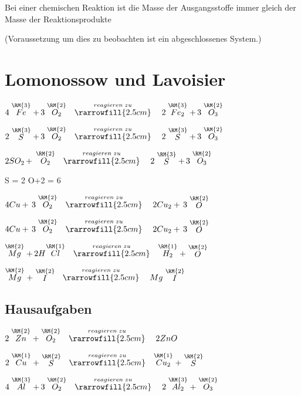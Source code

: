 Bei einer chemischen Reaktion ist die Masse der Ausgangsstoffe immer gleich der Masse der Reaktionsprodukte

(Voraussetzung um dies zu beobachten ist ein abgeschlossenes System.)

\section{Lomonossow und Lavoisier}
$4\stackrel{\RM{3}}{Fe} +\, 3\stackrel{\RM{2}}{O_2} \quad\stackrel{reagieren\;zu}{\rarrowfill{2.5cm}}\quad
2\stackrel{\RM{3}}{Fe_2} +\, 3\stackrel{\RM{2}}{O_3}$

$2\stackrel{\RM{3}}{S} +\, 3\stackrel{\RM{2}}{O_2} \quad\stackrel{reagieren\;zu}{\rarrowfill{2.5cm}}\quad
2\stackrel{\RM{3}}{S} +\, 3\stackrel{\RM{2}}{O_3}$

$2SO_2\, +\, \stackrel{\RM{2}}{O_2}
\quad\stackrel{reagieren\;zu}{\rarrowfill{2.5cm}}\quad 2\stackrel{\RM{3}}{S} +\, 3\stackrel{\RM{2}}{O_3}$

S\quad{} = 2\newline
O+2 = 6\newline

$4 Cu +\, 3\stackrel{\RM{2}}{O_2} \quad\stackrel{reagieren\;zu}{\rarrowfill{2.5cm}}\quad 2 Cu_2
+\, 3\stackrel{\RM{2}}{O}$

$4 Cu +\, 3\stackrel{\RM{2}}{O_2} \quad\stackrel{reagieren\;zu}{\rarrowfill{2.5cm}}\quad 2 Cu_2
+\, 3\stackrel{\RM{2}}{O}$

$\stackrel{\RM{2}}{Mg} +\, 2 H\hspace{-0.6ex}\stackrel{\RM{1}}{Cl} \quad\stackrel{reagieren\;zu}{\rarrowfill{2.5cm}}\quad
\stackrel{\RM{1}}{H_2} + \stackrel{\RM{2}}{O}$

$\stackrel{\RM{2}}{Mg} + \stackrel{\RM{2}}{I} \quad\stackrel{reagieren\;zu}{\rarrowfill{2.5cm}}\quad
Mg\stackrel{\RM{2}}{I}$
\subsection{Hausaufgaben}
$2\stackrel{\RM{2}}{Zn} + \stackrel{\RM{2}}{O_2} \quad\stackrel{reagieren\;zu}{\rarrowfill{2.5cm}}\quad
2 ZnO$

$2\stackrel{\RM{1}}{Cu} + \stackrel{\RM{2}}{S} \quad\stackrel{reagieren\;zu}{\rarrowfill{2.5cm}}\quad
\stackrel{\RM{1}}{Cu_2} + \stackrel{\RM{2}}{S}$

$4\stackrel{\RM{3}}{Al} +\, 3\stackrel{\RM{2}}{O_2} \quad\stackrel{reagieren\;zu}{\rarrowfill{2.5cm}}\quad
2\stackrel{\RM{3}}{Al_2} + \stackrel{\RM{2}}{O_3}$

